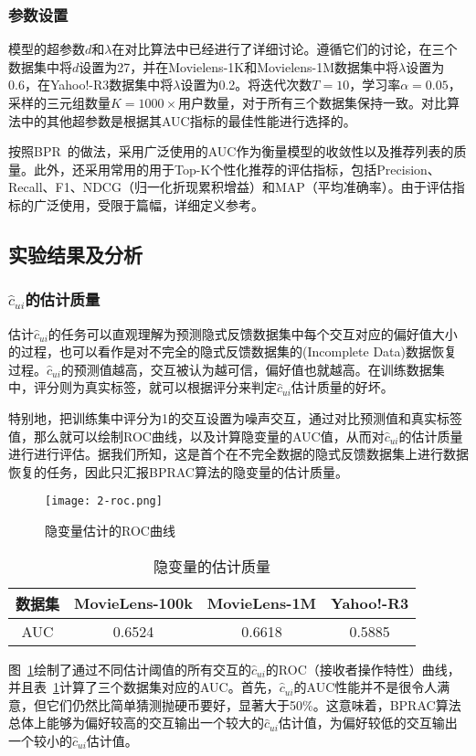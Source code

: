 \subsubsection{参数设置}
模型的超参数$d$和$\lambda$在对比算法中已经进行了详细讨论\cite{Steffen:2009:UAI,Weike:2013:IJCAI,Yu:2018:CIKM}。遵循它们的讨论，在三个数据集中将$d$设置为27，并在Movielens-1K和Movielens-1M数据集中将$\lambda$设置为0.6，在Yahoo!-R3数据集中将$\lambda$设置为0.2。将迭代次数$T=10$，学习率$\alpha=0.05$，采样的三元组数量$K=1000 \times$用户数量，对于所有三个数据集保持一致。对比算法中的其他超参数是根据其AUC指标的最佳性能进行选择的。

按照BPR~\cite{Steffen:2009:UAI}的做法，采用广泛使用的AUC作为衡量模型的收敛性以及推荐列表的质量。此外，还采用常用的用于Top-K个性化推荐的评估指标，包括Precision、Recall、F1、NDCG（归一化折现累积增益）和MAP（平均准确率）。由于评估指标的广泛使用，受限于篇幅，详细定义参考\cite{ml:2018}。

\subsection{实验结果及分析}
\subsubsection{$\hat{c}_{ui}$的估计质量}
估计$\hat{c}_{ui}$的任务可以直观理解为预测隐式反馈数据集中每个交互对应的偏好值大小的过程，也可以看作是对不完全的隐式反馈数据集的(Incomplete Data)数据恢复过程。$\hat{c}_{ui}$的预测值越高，交互被认为越可信，偏好值也就越高。在训练数据集中，评分则为真实标签，就可以根据评分来判定$\hat{c}_{ui}$估计质量的好坏。

特别地，把训练集中评分为1的交互设置为噪声交互，通过对比预测值和真实标签值，那么就可以绘制ROC曲线，以及计算隐变量的AUC值，从而对$\hat{c}_{ui}$的估计质量进行进行评估。据我们所知，这是首个在不完全数据的隐式反馈数据集上进行数据恢复的任务，因此只汇报BPRAC算法的隐变量的估计质量。
\begin{figure}[!]
	\centering
	\texttt{[image: 2-roc.png]}
	\caption{隐变量估计的ROC曲线}
	\label{Fig:ROC}
\end{figure}
\begin{table}[!]
	\centering
	\caption{隐变量的估计质量}\label{Table:ActionRecognition}
	\begin{tabular}{cccc}
		\toprule[1.2pt]
		数据集            & MovieLens-100k &	MovieLens-1M & Yahoo!-R3 \\ \hline
		AUC               & 0.6524       &  0.6618        & 0.5885 \\
		\bottomrule[1.2pt]
	\end{tabular}
\end{table}
图~\ref{Fig:ROC}绘制了通过不同估计阈值的所有交互的$\hat{c}_{ui}$的ROC（接收者操作特性）曲线，并且表~\ref{Table:ActionRecognition}计算了三个数据集对应的AUC。首先，$\hat{c}_{ui}$的AUC性能并不是很令人满意，但它们仍然比简单猜测抛硬币要好，显著大于50\%。这意味着，BPRAC算法总体上能够为偏好较高的交互输出一个较大的$\hat{c}_{ui}$估计值，为偏好较低的交互输出一个较小的$\hat{c}_{ui}$估计值。

